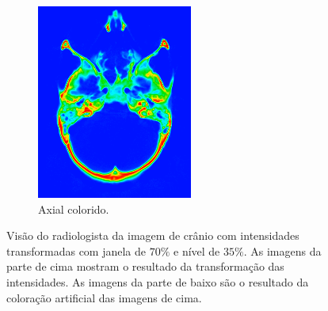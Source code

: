 \documentclass{article}
\begin{document}
\begin{figure}
\begin{subfigure}[b]{0.3\textwidth}
        \includegraphics[width=\textwidth]{skull/radiologist-axial.png}
        \caption{Axial colorido.}
    \end{subfigure}
    \caption{Visão do radiologista da imagem de crânio com intensidades transformadas com janela de $70\%$ e nível de $35\%$. As imagens da parte de cima mostram o resultado da transformação das intensidades. As imagens da parte de baixo são o resultado da coloração artificial das imagens de cima.}
    \label{fig:sull-visao-radiologista-cores}
\end{figure}
\end{document}
